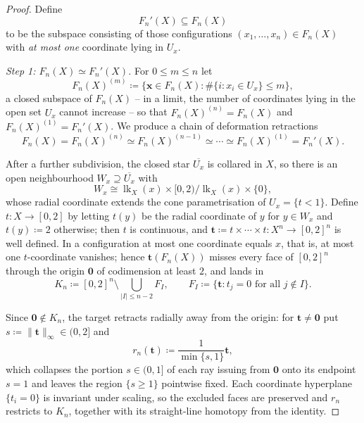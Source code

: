 \documentclass[10pt,a4paper]{amsart}
\newcommand\bft{\mathbf{t}}
\newcommand\bfx{\mathbf{x}}
\DeclareMathOperator{\lk}{lk}
\begin{document}
\begin{proof}
Define
\[
F_n'(X) \subseteq F_n(X)
\]
to be the subspace consisting of those configurations
\((x_1,\dots,x_n)\in F_n(X)\) with \emph{at most one} coordinate
lying in \(U_x\).

\smallskip
\noindent\emph{Step 1: \(F_n(X)\simeq F_n'(X)\).}
For \(0\le m\le n\) let
\[
F_n(X)^{(m)}\coloneqq
\bigl\{\bfx\in F_n(X) : \#\{i : x_i\in U_x\}\le m\bigr\},
\]
a closed subspace of \(F_n(X)\) -- in a limit, the number of
coordinates lying in the open set \(U_x\) cannot increase -- so
that \(F_n(X)^{(n)}=F_n(X)\) and \(F_n(X)^{(1)}=F_n'(X)\). We
produce a chain of deformation retractions
\[
F_n(X)=F_n(X)^{(n)}\simeq F_n(X)^{(n-1)}\simeq\cdots
\simeq F_n(X)^{(1)}=F_n'(X).
\]

After a further subdivision, the closed star \(\overline{U_x}\)
is collared in \(X\), so there is an open neighbourhood
\(W_x\supseteq\overline{U_x}\) with
\[
W_x\cong\lk_X(x)\times[0,2)\big/\lk_X(x)\times\{0\},
\]
whose radial coordinate extends the cone parametrisation of
\(U_x=\{t<1\}\). Define \(t\colon X\to[0,2]\) by letting
\(t(y)\) be the radial coordinate of \(y\) for \(y\in W_x\) and
\(t(y)\coloneqq2\) otherwise; then \(t\) is continuous, and
\(\bft\coloneqq t\times\cdots\times t\colon X^n\to[0,2]^n\) is
well defined. In a configuration at most one coordinate equals
\(x\), that is, at most one \(t\)-coordinate vanishes; hence
\(\bft(F_n(X))\) misses every face of \([0,2]^n\) through the
origin \(\mathbf0\) of codimension at least \(2\), and lands in
\[
K_n\coloneqq[0,2]^n\setminus
\bigcup_{|I|\le n-2}F_I,
\qquad
F_I\coloneqq\bigl\{\bft : t_j=0\text{ for all }j\notin
I\bigr\}.
\]

Since \(\mathbf0\notin K_n\), the target retracts radially away
from the origin: for \(\bft\neq\mathbf0\) put
\(s\coloneqq\|\bft\|_\infty\in(0,2]\) and
\[
r_n(\bft)\coloneqq\frac{1}{\min\{s,1\}}\bft,
\]
which collapses the portion \(s\in(0,1]\) of each ray issuing
from \(\mathbf0\) onto its endpoint \(s=1\) and leaves the
region \(\{s\ge1\}\) pointwise fixed. Each coordinate hyperplane
\(\{t_i=0\}\) is invariant under scaling, so the excluded faces
are preserved and \(r_n\) restricts to \(K_n\), together with
its straight-line homotopy from the identity.


\end{proof}
\end{document}
